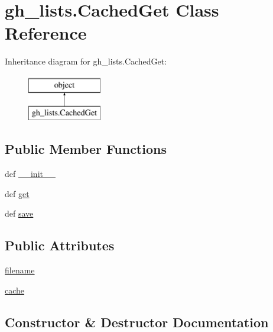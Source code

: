 \hypertarget{classgh__lists_1_1CachedGet}{}\section{gh\+\_\+lists.\+Cached\+Get Class Reference}
\label{classgh__lists_1_1CachedGet}
Inheritance diagram for gh\+\_\+lists.\+Cached\+Get\+:\begin{figure}[H]
\begin{center}
\leavevmode
\includegraphics[height=2.000000cm]{classgh__lists_1_1CachedGet}
\end{center}
\end{figure}
\subsection*{Public Member Functions}
\begin{DoxyCompactItemize}
\item 
def \hyperlink{classgh__lists_1_1CachedGet_aae56cb71888526e7506b5743e2e1f2db}{\+\_\+\+\_\+init\+\_\+\+\_\+}
\item 
def \hyperlink{classgh__lists_1_1CachedGet_af11ef601af9fe76174f6f011218c028e}{get}
\item 
def \hyperlink{classgh__lists_1_1CachedGet_a5bf00445cab0c3a95e402f93b19c0bf2}{save}
\end{DoxyCompactItemize}
\subsection*{Public Attributes}
\begin{DoxyCompactItemize}
\item 
\hyperlink{classgh__lists_1_1CachedGet_ae04bf6cc7ff9ea710d3e842eb1e4dadf}{filename}
\item 
\hyperlink{classgh__lists_1_1CachedGet_acf60579943447e604e86f7911a721660}{cache}
\end{DoxyCompactItemize}


\subsection{Constructor \& Destructor Documentation}
\hypertarget{classgh__lists_1_1CachedGet_aae56cb71888526e7506b5743e2e1f2db}{}
